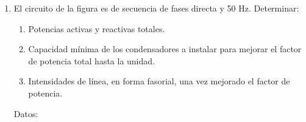 \begin{enumerate}
Una vez conectados los condensadores del último apartado:
\begin{enumerate}[resume]
\item Calcula el valor eficaz de la corriente de línea total.
\item Calcula el triángulo de potencias a la entrada de la línea.
\item Calcule el valor eficaz de la tensión a la entrada de la línea.
\item Determina la lectura de los vatímetros descritos anteriormente.
\end{enumerate}

  \emph{Sol.:\;
    $P_1 = \SI{30}{\kilo\watt};\; 
    Q_1 = \qty{24.06}{\kilo\voltampere_r};\; 
    S_1 = \SI{38.46}{\kilo\voltampere};\;
    P_2 = \SI{7.5}{\kilo\watt};\; 
    Q_2 = \qty{8.31}{\kilo\voltampere_r};\; 
    S_2 = \SI{11.19}{\kilo\voltampere}; \;
    P_T = \SI{37.5}{\kilo\watt};\; 
    Q_T = \qty{32.37}{\kilo\voltampere_r};\; S_T = \SI{49.54}{\kilo\voltampere};\; 
    I_1 = \qty{55.51}{\ampere};\; 
    I_2 = \qty{16.15}{\ampere};\; 
    I_T= \qty{71.5}{\ampere};\; 
    W_{A,AC} = \SI{28.09}{\kilo\watt};\;
    W_{B,BC} = \SI{9.41}{\kilo\watt};\;
    W_{C, BA} = \SI{-18.66}{\kilo\watt};\;
    P_g = \SI{39.73}{\kilo\watt};\; 
    Q_g = \qty{32.33}{\kilo\voltampere_r};\; 
    S_g = \SI{51.22}{\kilo\voltampere};\; 
    U_g = \qty{413.64}{\volt};\; 
    C_{\triangle} = \qty{214.4}{\micro\farad}/\mathrm{fase};\;
    I_T' = \qty{54.13}{\ampere};\; 
    P_g' = \SI{38.78}{\kilo\watt};\; 
    Q_g' = \qty{0}{\voltampere_r};\; 
    S_g' = \SI{38.78}{\kilo\voltampere};\; 
    U'_g = \qty{413.63}{\volt};\;
    W_{A,AC}' = \SI{18.75}{\kilo\watt};\;
    W_{B,BC}' = \SI{18.75}{\kilo\watt};\; 
    W'_{C,BA} = \SI{0}{\kilo\watt}$ }

 
\item El circuito de la figura es de secuencia de fases directa y 50
  Hz. Determinar:
  \begin{enumerate}
  \item Potencias activas y reactivas totales.
  \item Capacidad mínima de los condensadores a instalar para mejorar
    el factor de potencia total hasta la unidad.
  \item Intensidades de línea, en forma fasorial, una vez mejorado el
    factor de potencia.
  \end{enumerate}
  \begin{minipage}{0.4\linewidth}
    Datos:


\end{minipage}
\end{enumerate}
